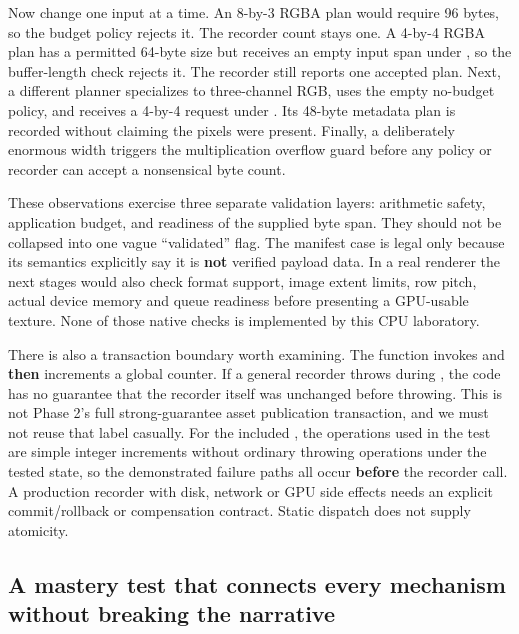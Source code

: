 Now change one input at a time. An 8-by-3 RGBA plan would require 96 bytes, so the budget policy rejects it. The recorder count stays one. A 4-by-4 RGBA plan has a permitted 64-byte size but receives an empty input span under , so the buffer-length check rejects it. The recorder still reports one accepted plan. Next, a different planner specializes to three-channel RGB, uses the empty no-budget policy, and receives a 4-by-4 request under . Its 48-byte metadata plan is recorded without claiming the pixels were present. Finally, a deliberately enormous width triggers the multiplication overflow guard before any policy or recorder can accept a nonsensical byte count.

These observations exercise three separate validation layers: arithmetic safety, application budget, and readiness of the supplied byte span. They should not be collapsed into one vague ``validated'' flag. The manifest case is legal only because its semantics explicitly say it is \textbf{not} verified payload data. In a real renderer the next stages would also check format support, image extent limits, row pitch, actual device memory and queue readiness before presenting a GPU-usable texture. None of those native checks is implemented by this CPU laboratory.

There is also a transaction boundary worth examining. The  function invokes  and \textbf{then} increments a global counter. If a general recorder throws during , the code has no guarantee that the recorder itself was unchanged before throwing. This is not Phase 2's full strong-guarantee asset publication transaction, and we must not reuse that label casually. For the included , the operations used in the test are simple integer increments without ordinary throwing operations under the tested state, so the demonstrated failure paths all occur \textbf{before} the recorder call. A production recorder with disk, network or GPU side effects needs an explicit commit/rollback or compensation contract. Static dispatch does not supply atomicity.

\subsection{A mastery test that connects every mechanism without breaking the narrative}\label{01-foundations-i-ch005-a-mastery-test-that-connects-every-mechanism-without-breaking-the-narrative}

